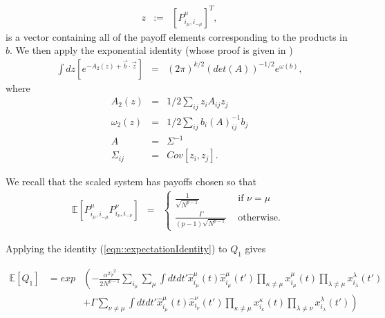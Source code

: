 \documentclass{article}
\newcommand{\xmu}[2]{x_{#1_#2}^{#2}(t)}
\newcommand{\xmudash}[2]{x_{#1_#2}^{#2}(t')}
\newcommand{\payoff}[2]{P^{#2}_{#1_#2, #1_{-#2}}}
\newcommand{\hxmu}[1]{\hat{x}_{#1_\mu}^{\mu} (t)}
\newcommand{\hxmudash}[1]{\hat{x}_{#1_\mu}^{\mu} (t')}
\newcommand{\hxnudash}[1]{\hat{x}_{#1_\nu}^{\nu} (t')}
\newcommand{\ttau}{\tilde{\tau}}
\begin{document}
\begin{eqnarray*}
       z & := & [ \payoff{i}{\mu} ]^T, 
\end{eqnarray*}
%
is a vector containing all of the payoff elements corresponding to the products in $b$. We then apply the exponential identity (whose proof is given in \cite{ZinnJustin2009})
%
\begin{eqnarray}
	\label{eqn::expectationIdentity}
		\int dz [e^{-A_2(z) + \Vec{b} \cdot \Vec{z}}] & = & (2 \pi)^{k/2} (det(A))^{-1/2} e^{\omega(b)},
	\end{eqnarray}
%
where
%
\begin{eqnarray*}
		A_2(z) & = & 1/2 \sum_{ij} z_i A_{ij} z_j \\
		\omega_2(z) &  = & 1/2 \sum_{ij} b_i (A)^{-1}_{ij} b_j\\
%
%
       A  & = & \Sigma^{-1} \\
       \Sigma_{ij} & = & Cov[z_i, z_j].
\end{eqnarray*}

We recall that the scaled system has payoffs chosen so that
%
\begin{eqnarray}
\label{eqn::Payoffs}
        \mathbb{E} \left[ \payoff{i}{\mu} \payoff{i}{\nu} \right] & = & \begin{cases}
        \frac{1}{\sqrt{N^{p-1}}}  & \text{ if } \nu = \mu \\
        \frac{\Gamma}{(p-1)\sqrt{N^{p-1}}} & \text{ otherwise. }
        \end{cases}
\end{eqnarray}

Applying the identity (\ref{eqn::expectationIdentity}) to $Q_1$ gives

\begin{eqnarray}
        \mathbb{E}[Q_1] & = exp & \left(  -\frac{\alpha^2 \ttau^2}{2 N^{p-1}} \sum_{i_\mu} \sum_\mu \int dt dt' \hxmu{i} \hxmudash{i} \prod_{\kappa \neq \mu} \xmu{i}{\mu} \prod_{\lambda \neq \mu} \xmudash{i}{\lambda} \right. \\
       & & \left. + \Gamma \sum_{\nu \neq \mu} \int dt dt' \hxmu{i} \hxnudash{i} \prod_{\kappa \neq \mu} \xmu{i}{\kappa} \prod_{\lambda \neq \nu} \xmudash{i}{\lambda}\right)
\end{eqnarray}
\end{document}
